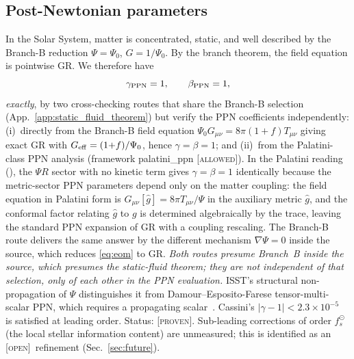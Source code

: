 \documentclass[aps,prd,twocolumn,nofootinbib,floatfix,superscriptaddress]{revtex4-2}
\newcommand{\PROVEN}{{\color{black!75!green}\textsc{[proven]}}}
\newcommand{\OPEN}{{\color{black!60!red}\textsc{[open]}}}
\begin{document}
\subsection{Post-Newtonian parameters}

In the Solar System, matter is concentrated, static, and well
described by the Branch-B reduction $\Psi=\Psi_0$, $G=1/\Psi_0$. By
the branch theorem, the field equation is pointwise GR. We therefore
have
\begin{equation}
\gamma_{\rm PPN} = 1,\qquad \beta_{\rm PPN} = 1,
\end{equation}
\emph{exactly}, by two cross-checking routes that share the
Branch-B selection (App.~\ref{app:static_fluid_theorem}) but verify
the PPN coefficients independently:
(i)~directly from the Branch-B field equation
$\Psi_0 G_{\mu\nu} = 8\pi(1{+}f)T_{\mu\nu}$ giving exact GR with
$G_{\rm eff} = (1{+}f)/\Psi_0$, hence $\gamma = \beta = 1$; and
(ii)~from the Palatini-class PPN analysis (framework
\textsf{palatini\_ppn} \textsc{[allowed]}). In the Palatini reading
(\cite{Olmo2005,Will2014}), the $\Psi R$ sector with no kinetic
term gives $\gamma = \beta = 1$ identically because the metric-sector
PPN parameters depend only on the matter coupling: the field
equation in Palatini form is $G_{\mu\nu}[\hat g] = 8\pi T_{\mu\nu}/\Psi$
in the auxiliary metric $\hat g$, and the conformal factor relating
$\hat g$ to $g$ is determined algebraically by the trace, leaving
the standard PPN expansion of GR with a coupling rescaling. The
Branch-B route delivers the same answer by the different mechanism
$\nabla\Psi = 0$ inside the source, which reduces \eqref{eq:eom}
to GR. \emph{Both routes presume Branch~B inside the source, which
presumes the static-fluid theorem; they are not independent of
that selection, only of each other in the PPN evaluation.} ISST's structural
non-propagation of $\Psi$ distinguishes it from
Damour--Esposito-Farese tensor-multi-scalar PPN, which requires a
propagating scalar~\cite{DamourEspositoFarese1992}. Cassini's
$|\gamma-1|<2.3\times 10^{-5}$~\cite{Bertotti2003} is satisfied at
leading order. Status: \PROVEN. Sub-leading corrections of order
$f_s^{\odot}$ (the local stellar information content) are unmeasured;
this is identified as an \OPEN\ refinement (Sec.~\ref{sec:future}).
\end{document}
